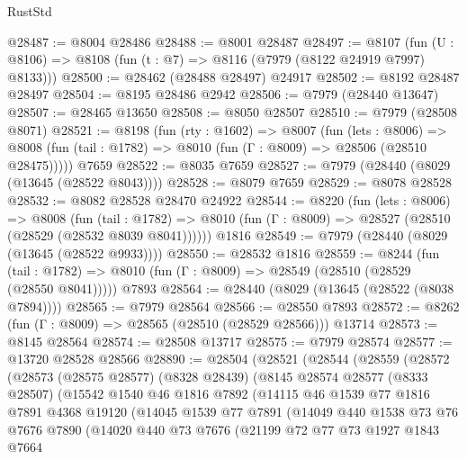 \begin{lexlean}{RustStd}
\begin{coremodule}
@28487 := @8004 @28486
@28488 := @8001 @28487
@28497 := @8107
    (fun (U : @8106) => @8108 (fun (t : @7) => @8116 (@7979 (@8122 @24919 @7997) @8133)))
@28500 := @28462 (@28488 @28497) @24917
@28502 := @8192 @28487 @28497
@28504 := @8195 @28486 @2942
@28506 := @7979 (@28440 @13647)
@28507 := @28465 @13650
@28508 := @8050 @28507
@28510 := @7979 (@28508 @8071)
@28521 := @8198
    (fun (rty : @1602) =>
    @8007
      (fun (lets : @8006) =>
      @8008 (fun (tail : @1782) => @8010 (fun (Γ : @8009) => @28506 (@28510 @28475)))))
    @7659
@28522 := @8035 @7659
@28527 := @7979 (@28440 (@8029 (@13645 (@28522 @8043))))
@28528 := @8079 @7659
@28529 := @8078 @28528
@28532 := @8082 @28528 @28470 @24922
@28544 := @8220
    (fun (lets : @8006) =>
    @8008
      (fun (tail : @1782) =>
      @8010 (fun (Γ : @8009) => @28527 (@28510 (@28529 (@28532 @8039 @8041))))))
    @1816
@28549 := @7979 (@28440 (@8029 (@13645 (@28522 @9933))))
@28550 := @28532 @1816
@28559 := @8244
    (fun (tail : @1782) => @8010 (fun (Γ : @8009) => @28549 (@28510 (@28529 (@28550 @8041)))))
    @7893
@28564 := @28440 (@8029 (@13645 (@28522 (@8038 @7894))))
@28565 := @7979 @28564
@28566 := @28550 @7893
@28572 := @8262 (fun (Γ : @8009) => @28565 (@28510 (@28529 @28566))) @13714
@28573 := @8145 @28564
@28574 := @28508 @13717
@28575 := @7979 @28574
@28577 := @13720 @28528 @28566
@28890 := @28504
    (@28521
      (@28544
        (@28559
          (@28572
            (@28573
              (@28575 @28577)
              (@8328 @28439)
              (@8145
                @28574
                @28577
                (@8333 @28507)
                (@15542
                  @1540
                  @46
                  @1816
                  @7892
                  (@14115
                    @46
                    @1539
                    @77
                    @1816
                    @7891
                    @4368
                    @19120
                    (@14045
                      @1539
                      @77
                      @7891
                      (@14049
                        @440
                        @1538
                        @73
                        @76
                        @7676
                        @7890
                        (@14020
                          @440
                          @73
                          @7676
                          (@21199
                            @72
                            @77
                            @73
                            @1927
                            @1843
                            @7664

\end{coremodule}
\end{lexlean}
